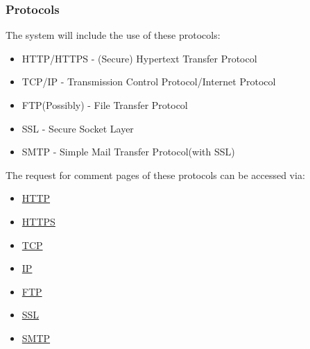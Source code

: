 \documentclass{article}
\begin{document}

		\subsubsection{Protocols}
		The system will include the use of these protocols:
		\begin{itemize}
			\item HTTP/HTTPS - (Secure) Hypertext Transfer Protocol
			\item TCP/IP - Transmission Control Protocol/Internet Protocol
			\item FTP(Possibly) - File Transfer Protocol
			\item SSL - Secure Socket Layer
			\item SMTP - Simple Mail Transfer Protocol(with  SSL)
		\end{itemize}
		The request for comment pages of these protocols can be accessed via:
		\begin{itemize}
			\item\href{https://tools.ietf.org/html/rfc2616}{HTTP}
			\item\href{https://tools.ietf.org/html/rfc2660}{HTTPS}
			\item\href{https://www.ietf.org/rfc/rfc793.txt}{TCP}
			\item\href{http://www.ietf.org/rfc/rfc0791.txt}{IP}
			\item\href{https://www.ietf.org/rfc/rfc959.txt}{FTP}
			\item\href{https://tools.ietf.org/html/rfc6101}{SSL}
			\item\href{https://tools.ietf.org/html/rfc821}{SMTP}
		\end{itemize}
\end{document}
